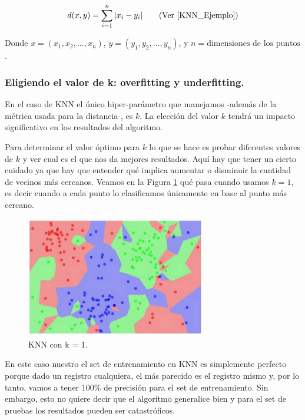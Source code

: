\documentclass[12pt,a4paper]{article}
\begin{document}
\begin{sloppypar}
\begin{equation}\label{eq:ecuacion_3}
d(x,y)=\sum_{i=1}^{n}|x_{i}-y_{i}|  \qquad  \text{(Ver \cite{KNN_Ejemplo})}
\end{equation}

Donde $x=(x_{1},x_{2},..., x_{n})$, $y = (y_{1},y_{2},...,y_{n})$, y $n = \text{dimensiones de los puntos}$.

\cleardoublepage
\subsubsection{Eligiendo el valor de k: overfitting y underfitting.}

En el caso de KNN el único hiper-parámetro que manejamos -además de la métrica usada para la distancia-, es $k$. La elección del valor $k$ tendrá un impacto significativo en los resultados del algoritmo. 

Para determinar el valor óptimo para $k$ lo que se hace es probar diferentes valores de $k$ y ver cual es el que nos da mejores resultados. Aquí hay que tener un cierto cuidado ya que hay que entender qué implica aumentar o disminuir la cantidad de vecinos más cercanos.
Veamos en la Figura \ref{fig:KNN_k_1} qué pasa cuando usamos $k = 1$, es decir cuando a cada punto lo clasificamos únicamente en base al punto más cercano.

\begin{figure}[H]    %
 \centering
 \includegraphics[width=0.7\textwidth]{images/KNN_k_1.png}
 \captionsetup{justification=centering,margin=2cm}
 \caption{KNN con k = 1. \cite{apunte_uba}} 
 \label{fig:KNN_k_1}
\end{figure}

En este caso nuestro el set de entrenamiento en KNN es simplemente perfecto porque dado un registro cualquiera, el más parecido es el registro mismo y, por lo tanto, vamos a tener 100\% de precisión para el set de entrenamiento. Sin embargo, esto no quiere decir que el algoritmo generalice bien y para el set de pruebas los resultados pueden ser catastróficos.


\end{sloppypar}
\end{document}

